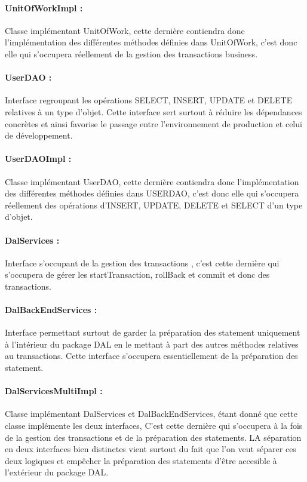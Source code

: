 \documentclass{article}[12pt]
\begin{document}
\paragraph{UnitOfWorkImpl : } Classe implémentant UnitOfWork, cette dernière contiendra donc l'implémentation des différentes méthodes définies dans UnitOfWork, c'est donc elle qui s'occupera réellement de la gestion des transactions business.
\paragraph{UserDAO : } Interface regroupant les opérations SELECT, INSERT, UPDATE et DELETE relatives à un type d'objet. Cette interface sert surtout à réduire les dépendances concrètes et ainsi favorise le passage entre l’environnement de production et celui de développement. 
\paragraph{UserDAOImpl : } Classe implémentant UserDAO, cette dernière contiendra donc l'implémentation des différentes méthodes définies dans USERDAO, c'est donc elle qui s'occupera réellement des opérations d'INSERT, UPDATE, DELETE et SELECT d'un type d'objet.
\paragraph{DalServices : } Interface s'occupant de la gestion des transactions , c'est cette dernière qui s'occupera de gérer les startTransaction, rollBack et commit et donc des transactions. 
\paragraph{DalBackEndServices : } Interface permettant surtout de garder la préparation des statement uniquement à l'intérieur du package DAL en le mettant à part des autres méthodes relatives au transactions. Cette interface s’occupera essentiellement de la préparation des statement.
\paragraph{DalServicesMultiImpl : } Classe implémentant DalServices et DalBackEndServices, étant donné que cette classe implémente les deux interfaces, C'est cette dernière qui s'occupera à la fois de la gestion des transactions et de la préparation des statements. LA séparation en deux interfaces bien distinctes vient surtout du fait que l'on veut séparer ces deux logiques et empêcher la préparation des statements d'être accesible à l'extérieur du package DAL. 
\end{document}
